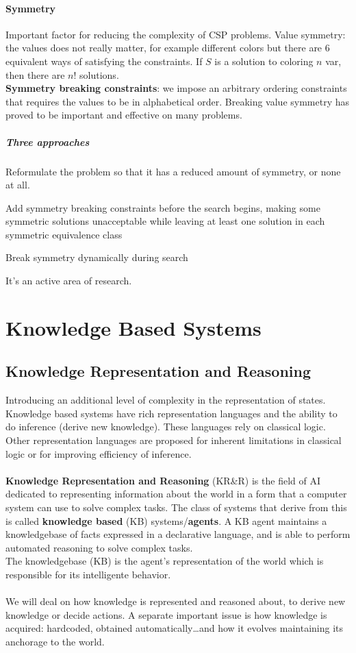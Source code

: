 \documentclass[10pt]{report}
\begin{document}
\paragraph{Symmetry} Important factor for reducing the complexity of CSP problems. Value symmetry: the values does not really matter, for example different colors but there are 6 equivalent ways of satisfying the constraints. If $S$ is a solution to coloring $n$ var, then there are $n!$ solutions.\\
\textbf{Symmetry breaking constraints}: we impose an arbitrary ordering constraints that requires the values to be in alphabetical order. Breaking value symmetry has proved to be important and effective on many problems.
\subparagraph{Three approaches}
\begin{list}{}{}
	\item Reformulate the problem so that it has a reduced amount of symmetry, or none at all.
	\item Add symmetry breaking constraints before the search begins, making some symmetric solutions unacceptable while leaving at least one solution in each symmetric equivalence class
	\item Break symmetry dynamically during search
\end{list}
It's an active area of research.
\section{Knowledge Based Systems}
\subsection{Knowledge Representation and Reasoning}
Introducing an additional level of complexity in the representation of states. Knowledge based systems have rich representation languages and the ability to do inference (derive new knowledge). These languages rely on classical logic.\\
Other representation languages are proposed for inherent limitations in classical logic or for improving efficiency of inference.\\\\
\textbf{Knowledge Representation and Reasoning} (KR\&R) is the field of AI dedicated to representing information about the world in a form that a computer system can use to solve complex tasks. The class of systems that derive from this is called \textbf{knowledge based} (KB) systems/\textbf{agents}. A KB agent maintains a knowledgebase of facts expressed in a declarative language, and is able to perform automated reasoning to solve complex tasks.\\
The knowledgebase (KB) is the agent's representation of the world which is responsible for its intelligente behavior.\\\\
We will deal on how knowledge is represented and reasoned about, to derive new knowledge or decide actions. A separate important issue is how knowledge is acquired: hardcoded, obtained automatically\ldots and how it evolves maintaining its anchorage to the world.
\end{document}
